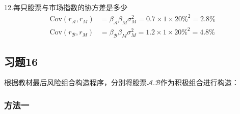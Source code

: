 \documentclass{article}
\begin{document}
12.每只股票与市场指数的协方差是多少
\begin{align}
    \text{Cov}(r_\mathcal{A} ,r_M )&=\beta_\mathcal{A}  \beta_M \sigma_M^2=0.7\times 1\times 20\%^2=2.8\%\\
    \text{Cov}(r_\mathcal{B} ,r_M )&=\beta_\mathcal{B}  \beta_M \sigma_M^2=1.2\times 1\times 20\%^2=4.8\%
\end{align}
\clearpage

\subsection*{习题16}
根据教材最后风险组合构造程序，分别将股票$\mathcal{A} .\mathcal{B} $作为积极组合进行构造：
\subsubsection*{方法一}
\end{document}
